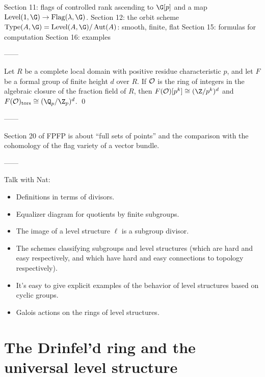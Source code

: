 Section 11: flags of controlled rank ascending to $\G[p]$ and a map $\Level(1, \G) \to \operatorname{Flag}(\lambda, \G)$.
Section 12: the orbit scheme $\operatorname{Type}(A, \G) = \Level(A, \G) / \operatorname{Aut}(A)$: smooth, finite, flat
Section 15: formulas for computation
Section 16: examples

------

\begin{theorem}
Let $R$ be a complete local domain with positive residue characteristic $p$, and let $F$ be a formal group of finite height $d$ over $R$.  If $\mathcal{O}$ is the ring of integers in the algebraic closure of the fraction field of $R$, then $F(\sheaf O)[p^k] \cong (\Z/p^k)^d$ and $F(\sheaf O)_{\mathrm{tors}} \cong (\Q_p / \Z_p)^d$. \qed
\end{theorem}

------

Section 20 of FPFP is about ``full sets of points'' and the comparison with the cohomology of the flag variety of a vector bundle.

------

Talk with Nat:
\begin{itemize}
\item Definitions in terms of divisors.
\item Equalizer diagram for quotients by finite subgroups.
\item The image of a level structure $\ell$ is a subgroup divisor.
\item The schemes classifying subgroups and level structures (which are hard and easy respectively, and which have hard and easy connections to topology respectively).
\item It's easy to give explicit examples of the behavior of level structures based on cyclic groups.
\item Galois actions on the rings of level structures.
\end{itemize}




\section{The Drinfel'd ring and the universal level structure}

